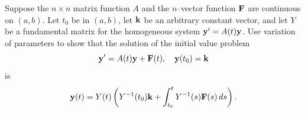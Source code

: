 \begin{exerciselist}
\item\label{exer:10.7.23}Suppose the $n\times n$ matrix function $A$ and the $n$--vector
function $\mathbf{F}$ are continuous on $(a,b)$. Let $t_0$ be in $(a,b)$,
let $\mathbf{k}$ be an arbitrary constant vector, and let $Y$ be a
fundamental matrix for the homogeneous system $\mathbf{y}'=A(t)\mathbf{y}$.
Use variation of parameters to show that the solution of the initial
value problem
\[
\mathbf{y}'=A(t)\mathbf{y}+\mathbf{F}(t),\quad \mathbf{y}(t_0)=\mathbf{k}
\]
is
\[
\mathbf{y}(t)=Y(t)\left( Y^{-1}(t_0)\mathbf{k}+\int_{t_0}^t
Y^{-1}(s)\mathbf{F}(s)\, ds\right).
\]

\end{exerciselist}

